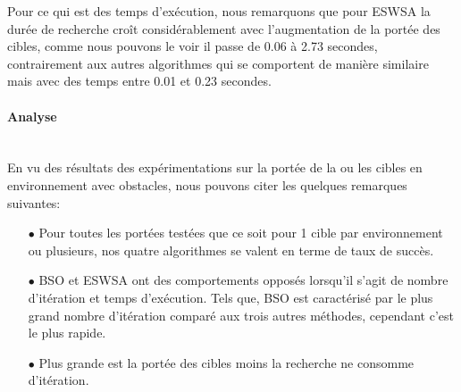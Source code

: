 	Pour ce qui est des temps d'exécution, nous remarquons que pour ESWSA la durée de recherche croît considérablement avec l'augmentation de la portée des cibles, comme nous pouvons le voir il passe de 0.06 à 2.73 secondes, contrairement aux autres algorithmes qui se comportent de manière similaire mais avec des temps entre 0.01 et 0.23 secondes.




\hspace{-0.5cm}
\noindent
\begin{minipage}[t]{0.55\textwidth}
	\captionsetup{width=0.8\linewidth}
	\centering{}
	\label{IP5o}
\end{minipage}\hfill
\hspace{-1cm}
\begin{minipage}[t]{0.55\textwidth}
	\captionsetup{width=0.8\linewidth}
	\centering{}
	\label{tP5o}
\end{minipage}\hfill




\paragraph{Analyse}
\textbf{ }\\
En vu des résultats des expérimentations sur la portée de la ou les cibles en environnement avec obstacles, nous pouvons citer les quelques remarques suivantes:
\begin{itemize}
	\item[$\bullet$] Pour toutes les portées testées que ce soit pour 1 cible par environnement ou plusieurs, nos quatre algorithmes se valent en terme de taux de succès.
	\item[$\bullet$] BSO et ESWSA ont des comportements opposés lorsqu'il s'agit de nombre d'itération et temps d'exécution. Tels que, BSO est caractérisé par le plus grand nombre d'itération comparé aux trois autres méthodes, cependant c'est le plus rapide.
	\item[$\bullet$] Plus grande est la portée des cibles moins la recherche ne consomme d'itération.
\end{itemize}










